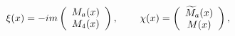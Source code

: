 \begin{equation}
\xi (x)=-im\left(
\begin{array}{c}
M_a(x) \\
M_4(x)
\end{array}
\right) ,\hspace{0.3in}\chi (x)=\left(
\begin{array}{c}
\widetilde{M}_a(x) \\
M(x)
\end{array}
\right) , \label{25}
\end{equation}

